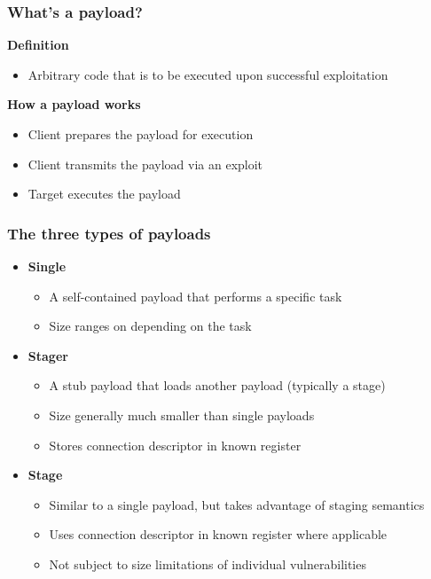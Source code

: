 \documentclass{beamer}
\newenvironment{sitemize}{\vspace{1mm}\begin{itemize}\itemsep 4pt\small}{\end{itemize}}
\begin{document}
\begin{frame}[t]
    \frametitle{What's a payload?}

    \textbf{Definition}
    \begin{sitemize}
        \item Arbitrary code that is to be executed upon successful
        exploitation
    \end{sitemize}

    \pause
    \textbf{How a payload works}
    \begin{sitemize}
        \item<3-> Client prepares the payload for execution
        \item<4-> Client transmits the payload via an exploit
        \item<5-> Target executes the payload
    \end{sitemize}
\end{frame}

\begin{frame}[t]
    \frametitle{The three types of payloads}

    \begin{sitemize}
        \item \textbf{Single}
        \begin{sitemize}
            \item A self-contained payload that performs a specific
            task
            \item Size ranges on depending on the task
        \end{sitemize}

        \pause
        \item \textbf{Stager}
        \begin{sitemize}
            \item A stub payload that loads another payload
            (typically a stage)
            \item Size generally much smaller than single payloads
            \item Stores connection descriptor in known register
        \end{sitemize}

        \pause
        \item \textbf{Stage}
        \begin{sitemize}
            \item Similar to a single payload, but takes advantage
            of staging semantics
            \item Uses connection descriptor in known register where
            applicable
            \item Not subject to size limitations of individual
            vulnerabilities
        \end{sitemize}
    \end{sitemize}
\end{frame}
\end{document}
